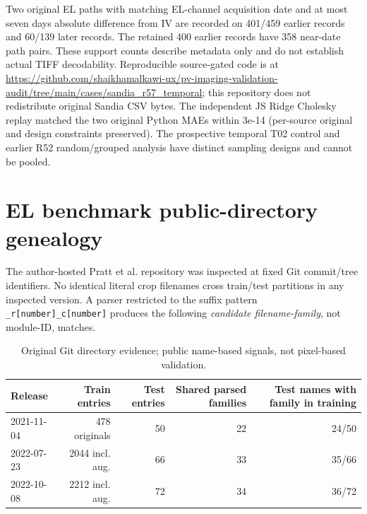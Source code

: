 \documentclass[10pt,a4paper]{article}
\begin{document}
Two original EL paths with matching EL-channel acquisition date and at most seven days absolute difference from IV are recorded on 401/459 earlier records and 60/139 later records. The retained 400 earlier records have 358 near-date path pairs. These support counts describe metadata only and do not establish actual TIFF decodability. Reproducible source-gated code is at \url{https://github.com/shaikhamalkawi-ux/pv-imaging-validation-audit/tree/main/cases/sandia_r57_temporal}; this repository does not redistribute original Sandia CSV bytes. The independent JS Ridge Cholesky replay matched the two original Python MAEs within 3e-14 (per-source original and design constraints preserved). The prospective temporal T02 control and earlier R52 random/grouped analysis have distinct sampling designs and cannot be pooled.

\section{EL benchmark public-directory genealogy}
The author-hosted Pratt et al. repository was inspected at fixed Git commit/tree identifiers. No identical literal crop filenames cross train/test partitions in any inspected version. A parser restricted to the suffix pattern \texttt{\_r[number]\_c[number]} produces the following \emph{candidate filename-family}, not module-ID, matches.
\begin{table}[ht]\centering\small
\caption{Original Git directory evidence; public name-based signals, not pixel-based validation.}
\begin{tabularx}{\linewidth}{@{}Xrrrr@{}}\toprule
Release & Train entries & Test entries & Shared parsed families & Test names with family in training \\\midrule
2021-11-04 & 478 originals & 50 & 22 & 24/50 \\
2022-07-23 & 2044 incl. aug. & 66 & 33 & 35/66 \\
2022-10-08 & 2212 incl. aug. & 72 & 34 & 36/72 \\
\bottomrule\end{tabularx}
\end{table}
\end{document}
